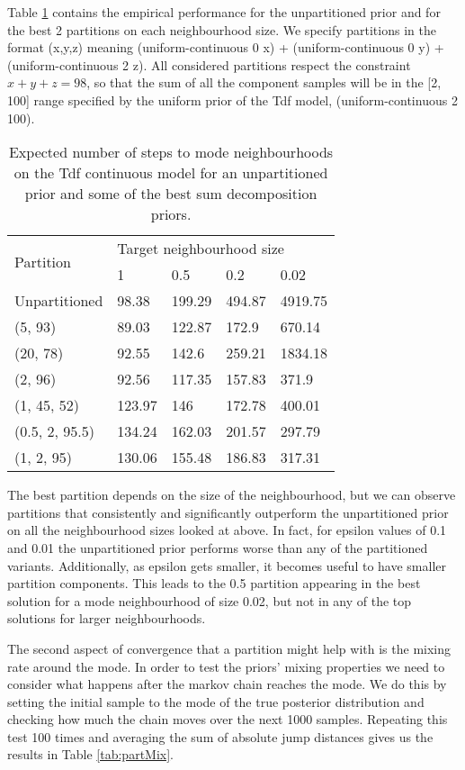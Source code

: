 Table \ref{tab:bestParts} contains the empirical performance for the unpartitioned prior and for the best 2 partitions on each neighbourhood size. We specify partitions in the format (x,y,z) meaning (uniform-continuous 0 x) + (uniform-continuous 0 y) + (uniform-continuous 2 z). All considered partitions respect the constraint $x+y+z = 98$, so that the sum of all the component samples will be in the [2, 100] range specified by the uniform prior of the Tdf model, (uniform-continuous 2 100). 

\begin{table}[h]
  \centering
  \begin{tabular}{lllll}
    \toprule
    \multirow{2}{*}{Partition} & \multicolumn{4}{l}{Target neighbourhood size} \\
    \cmidrule(r){2-5} 
    & 1 & 0.5 & 0.2 & 0.02 \\
    \midrule
    Unpartitioned & 98.38 & 199.29 & 494.87 & 4919.75 \\
    (5, 93) & 89.03 & 122.87 & 172.9  & 670.14 \\
    (20, 78)& 92.55 & 142.6  & 259.21 & 1834.18 \\
    (2, 96) & 92.56 & 117.35 & 157.83 & 371.9 \\
    (1, 45, 52) & 123.97 & 146 & 172.78 & 400.01 \\
    (0.5, 2, 95.5) & 134.24 & 162.03 & 201.57 & 297.79 \\
    (1, 2, 95) & 130.06 & 155.48  & 186.83 & 317.31 \\
    \bottomrule
  \end{tabular}
  \caption{Expected number of steps to mode neighbourhoods on the Tdf continuous model for an unpartitioned prior and some of the best sum decomposition priors.}
  \label{tab:bestParts}
\end{table}

The best partition depends on the size of the neighbourhood, but we can observe partitions that consistently and significantly outperform the unpartitioned prior on all the neighbourhood sizes looked at above. In fact, for epsilon values of 0.1 and 0.01 the unpartitioned prior performs worse than any of the partitioned variants. Additionally, as epsilon gets smaller, it becomes useful to have smaller partition components. This leads to the 0.5 partition appearing in the best solution for a mode neighbourhood of size 0.02, but not in any of the top solutions for larger neighbourhoods.

The second aspect of convergence that a partition might help with is the mixing rate around the mode. In order to test the priors' mixing properties we need to consider what happens after the markov chain reaches the mode. We do this by setting the initial sample to the mode of the true posterior distribution and checking how much the chain moves over the next 1000 samples. Repeating this test 100 times and averaging the sum of absolute jump distances gives us the results in Table \ref{tab:partMix}.

